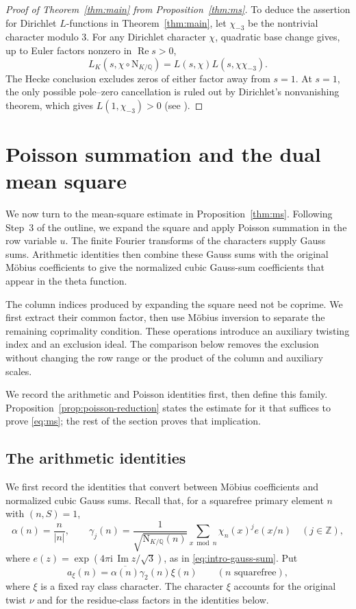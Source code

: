 \documentclass[11pt,a4paper]{article}
\numberwithin{equation}{section}
\numberwithin{figure}{section}
\theoremstyle{definition}
\theoremstyle{remark}
\newcommand{\Q}{\mathbb Q}
\newcommand{\NK}{\mathrm N_{K/\Q}}
\newcommand{\Rea}{\operatorname{Re}}
\begin{document}
\begin{proof}[Proof of Theorem~\ref{thm:main} from Proposition~\ref{thm:ms}]
To deduce the assertion for Dirichlet $L$-functions in
Theorem~\ref{thm:main}, let $\chi_{-3}$ be the nontrivial character modulo $3$.
For any Dirichlet character $\chi$, quadratic base change gives, up to
Euler factors nonzero in $\Rea s>0$,
\[
 L_K(s,\chi\circ\NK)
       =L(s,\chi)L(s,\chi\chi_{-3}).
\]
The Hecke conclusion excludes zeros of either factor away from $s=1$.
At $s=1$, the only possible pole--zero cancellation is ruled out by
Dirichlet's nonvanishing theorem, which gives
$L(1,\chi_{-3})>0$ (see \cite[Chapters~4 and~6]{Dav00}).
\end{proof}

\section{Poisson summation and the dual mean square}\label{sec:initialization}

We now turn to the mean-square estimate in Proposition~\ref{thm:ms}.
Following Step~3 of the outline, we expand the square and apply
Poisson summation in the row variable $u$. The finite Fourier
transforms of the characters supply Gauss sums. Arithmetic identities
then combine these Gauss sums with the original M\"obius coefficients
to give the normalized cubic Gauss-sum coefficients that appear in the theta
function.

The column indices produced by expanding the square need not be
coprime. We first extract their common factor, then use M\"obius
inversion to separate the remaining coprimality condition. These
operations introduce an auxiliary twisting index and an exclusion
ideal. The comparison below removes the exclusion without changing
the row range or the product of the column and auxiliary scales.

We record the arithmetic and Poisson identities first, then define
this family. Proposition~\ref{prop:poisson-reduction} states the
estimate for it that suffices to prove \eqref{eq:ms}; the rest of
the section proves that implication.

\subsection{The arithmetic identities}
We first record the identities that convert between M\"obius
coefficients and normalized cubic Gauss sums. Recall that, for a
squarefree primary element $n$ with $(n,S)=1$,
\[
 \alpha(n)=\frac{n}{|n|},\qquad
 \gamma_j(n)=\frac{1}{\sqrt{\NK(n)}}
       \sum_{x\bmod n}\chi_n(x)^j e(x/n)\quad(j\in\mathbb Z),
\]
where $e(z)=\exp(4\pi\mathrm i\,\operatorname{Im}z/\sqrt3)$, as in
\eqref{eq:intro-gauss-sum}. Put
\[
 a_\xi(n)=\overline{\alpha(n)}\gamma_2(n)\xi(n)
 \qquad(n\text{ squarefree}),
\]
where $\xi$ is a fixed ray class character. The character $\xi$ accounts for the original
twist $\nu$ and for the residue-class factors in the identities below.
\end{document}
